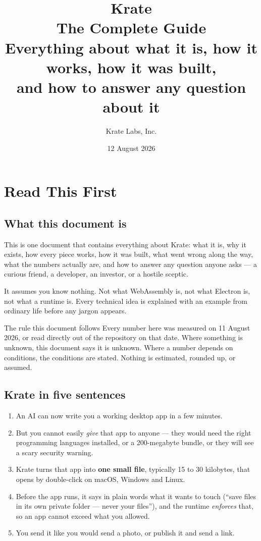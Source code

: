 \documentclass[11pt,a4paper]{report}
\title{\vspace{-2cm}\Huge\textbf{Krate}\\[0.3cm]
  \Large The Complete Guide\\[0.6cm]
  \normalsize Everything about what it is, how it works, how it was built,\\
  and how to answer any question about it\\[1cm]}
\author{Krate Labs, Inc.}
\date{12 August 2026}
\begin{document}
\maketitle
\tableofcontents

\chapter{Read This First}

\section{What this document is}

This is one document that contains everything about Krate: what it is, why
it exists, how every piece works, how it was built, what went wrong along
the way, what the numbers actually are, and how to answer any question
anyone asks --- a curious friend, a developer, an investor, or a hostile
sceptic.

It assumes you know nothing. Not what WebAssembly is, not what Electron
is, not what a runtime is. Every technical idea is explained with an
example from ordinary life before any jargon appears.

\begin{factbox}{The rule this document follows}
Every number here was measured on 11 August 2026, or read directly out of
the repository on that date. Where something is unknown, this document
says it is unknown. Where a number depends on conditions, the conditions
are stated. Nothing is estimated, rounded up, or assumed.
\end{factbox}

\section{Krate in five sentences}

\begin{enumerate}[leftmargin=*]
  \item An AI can now write you a working desktop app in a few minutes.
  \item But you cannot easily \emph{give} that app to anyone --- they would
    need the right programming languages installed, or a 200-megabyte
    bundle, or they will see a scary security warning.
  \item Krate turns that app into \textbf{one small file}, typically 15 to
    30 kilobytes, that opens by double-click on macOS, Windows and Linux.
  \item Before the app runs, it says in plain words what it wants to touch
    (``save files in its own private folder --- never your files''), and
    the runtime \emph{enforces} that, so an app cannot exceed what you
    allowed.
  \item You send it like you would send a photo, or publish it and send a
    link.
\end{enumerate}
\end{document}

